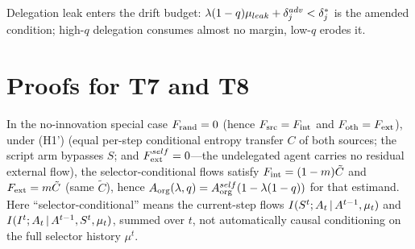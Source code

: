 \begin{corollary}
Delegation leak enters the drift budget:
$\lambda(1-q)\mu_{leak}+\delta_j^{adv}<\delta^{*}_j$ is the amended condition;
high-$q$ delegation consumes almost no margin, low-$q$ erodes it.
\end{corollary}

\section{Proofs for T7 and T8}\label{app:t7t8}

\begin{theorem}
In the no-innovation special case $F_{\mathrm{rand}}=0$ (hence $F_{\mathrm{src}}=F_{\mathrm{int}}$ and
$F_{\mathrm{oth}}=F_{\mathrm{ext}}$), under \textup{(H1')} (equal per-step conditional entropy transfer $C$ of both
sources; the script arm bypasses $S$; and $F_{\mathrm{ext}}^{self}=0$---the undelegated
agent carries no residual external flow), the selector-conditional flows
satisfy $F_{\mathrm{int}}=(1-m)\tilde C$ and $F_{\mathrm{ext}}=m\tilde C$ (same $\tilde C$), hence
$A_{\mathrm{org}}(\lambda,q)=A_{\mathrm{org}}^{self}(1-\lambda(1-q))$ for that estimand.
Here ``selector-conditional'' means the current-step flows
$I(S^t;A_t\,|\, A^{t-1},\mu_t)$ and
$I(I^t;A_t\,|\, A^{t-1},S^t,\mu_t)$, summed over $t$, not automatically
causal conditioning on the full selector history $\mu^t$.
\end{theorem}
